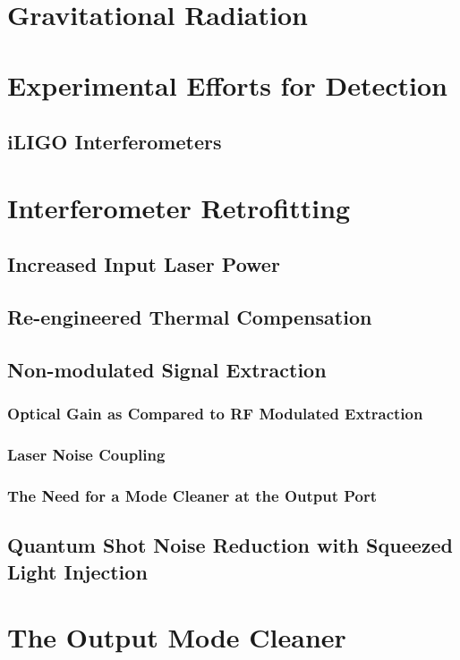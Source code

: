 \documentclass[12pt,vi,twoside]{mitthesis}
\begin{document}

\pagestyle{plain}

%


\chapter{Gravitational Radiation}

\chapter{Experimental Efforts for Detection}
\section{iLIGO Interferometers}

\chapter{Interferometer Retrofitting}
\label{ch:retro}
\section{Increased Input Laser Power}
\section{Re-engineered Thermal Compensation}
\section{Non-modulated Signal Extraction}
\subsection{Optical Gain as Compared to RF Modulated Extraction}
\subsection{Laser Noise Coupling}
\subsection{The Need for a Mode Cleaner at the Output Port}
\section{Quantum Shot Noise Reduction with Squeezed Light Injection}

\chapter{The Output Mode Cleaner}
\end{document}
